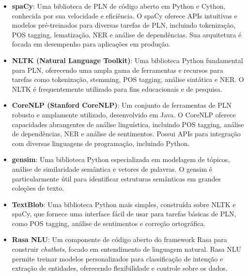 \documentclass[14pt,a4paper,oneside]{book}
\begin{document}
\begin{itemize}
    \item \textbf{spaCy}: Uma biblioteca de PLN de código aberto em Python e Cython, conhecida por sua velocidade e eficiência. O spaCy oferece APIs intuitivas e modelos pré-treinados para diversas tarefas de PLN, incluindo tokenização, POS tagging, lematização, NER e análise de dependências. Sua arquitetura é focada em desempenho para aplicações em produção.
    \item \textbf{NLTK (Natural Language Toolkit)}: Uma biblioteca Python fundamental para PLN, oferecendo uma ampla gama de ferramentas e recursos para tarefas como tokenização, stemming, POS tagging, análise sintática e NER. O NLTK é frequentemente utilizado para fins educacionais e de pesquisa.
    \item \textbf{CoreNLP (Stanford CoreNLP)}: Um conjunto de ferramentas de PLN robusto e amplamente utilizado, desenvolvido em Java. O CoreNLP oferece capacidades abrangentes de análise linguística, incluindo POS tagging, análise de dependências, NER e análise de sentimentos. Possui APIs para integração com diversas linguagens de programação, incluindo Python.
    \item \textbf{gensim}: Uma biblioteca Python especializada em modelagem de tópicos, análise de similaridade semântica e vetores de palavras. O gensim é particularmente útil para identificar estruturas semânticas em grandes coleções de texto.
    \item \textbf{TextBlob}: Uma biblioteca Python mais simples, construída sobre NLTK e spaCy, que fornece uma interface fácil de usar para tarefas básicas de PLN, como POS tagging, análise de sentimentos e correção ortográfica.
    
	
    \item \textbf{Rasa NLU}: Um componente de código aberto do framework Rasa para construir \textit{chatbots}, focado em entendimento de linguagem natural. Rasa NLU permite treinar modelos personalizados para classificação de intenção e extração de entidades, oferecendo flexibilidade e controle sobre os dados.
\end{itemize}
\end{document}
